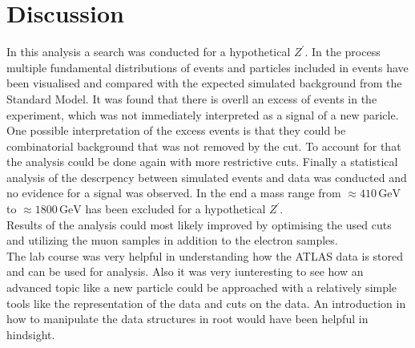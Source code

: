 \section{Discussion}
\label{sec:Diskussion}
In this analysis a search was conducted for a hypothetical $Z^\prime$. In the process multiple fundamental distributions of events and particles included 
in events have been visualised and compared with the expected simulated background from the Standard Model. It was found that there is overll an excess 
of events in the experiment, which was not immediately interpreted as a signal of a new paricle. One possible interpretation of the excess events is 
that they could be combinatorial background that was not removed by the cut. To account for that the analysis could be done again with more restrictive cuts. 
Finally a statistical analysis of the descrpency between simulated events and data was conducted and no evidence for a signal was observed. In the end a mass 
range from $\approx 410 \, \si{\giga\eV}$ to $\approx 1800 \, \si{\giga\eV}$ has been excluded for a hypothetical $Z^\prime$.\\
Results of the analysis could most likely improved by optimising the used cuts and utilizing the muon samples in addition to the electron samples. \\
The lab course was very helpful in understanding how the ATLAS data is stored and can be used for analysis. Also it was very iunteresting to see how 
an advanced topic like a new particle could be approached with a relatively simple tools like the representation of the data and cuts on the data. An introduction 
in how to manipulate the data structures in root would have been helpful in hindsight.